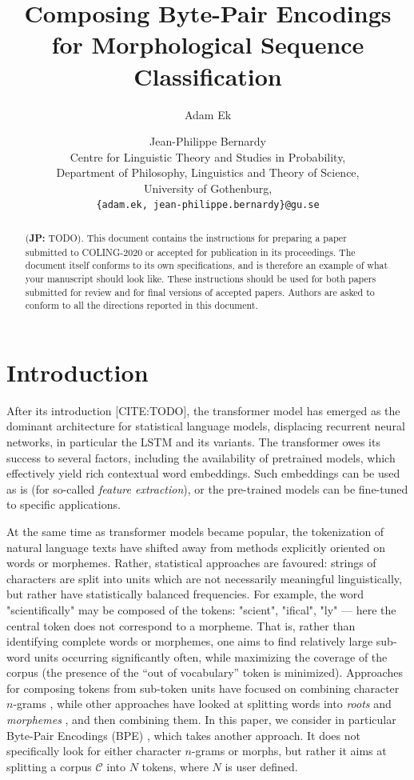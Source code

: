 \documentclass[11pt]{article}
\title{Composing Byte-Pair Encodings for Morphological Sequence Classification}
\author{Adam Ek \and Jean-Philippe Bernardy\\
	Centre for Linguistic Theory and Studies in Probability,\\
	Department of Philosophy, Linguistics and Theory of Science,\\
	University of Gothenburg,\\
	\texttt{\{adam.ek, jean-philippe.bernardy\}@gu.se}}
\date{}
\newcommand\jp[1]{(\textbf{JP:} #1)}
\newcommand\citep{\cite}
\begin{document}
	\maketitle
	
	\begin{abstract}
		\jp{TODO}. This document contains the instructions for preparing a paper submitted
		to COLING-2020 or accepted for publication in its proceedings. The document itself
		conforms to its own specifications, and is therefore an example of
		what your manuscript should look like. These instructions should be
		used for both papers submitted for review and for final versions of
		accepted papers. Authors are asked to conform to all the directions
		reported in this document.
	\end{abstract}
	
	\section{Introduction}
	\label{intro}

            After its introduction [CITE:TODO], the transformer model
     \citep{vaswani2017attention} has emerged as the dominant
     architecture for statistical language models, displacing
     recurrent neural networks, in particular the LSTM and its
     variants. The transformer owes its success to several factors,
     including the availability of pretrained models, which
     effectively yield rich contextual word embeddings. Such
     embeddings can be used as is (for so-called \emph{feature extraction}),
     or the pre-trained models can be fine-tuned to specific
     applications.

    	At the same time as transformer models became popular, the
     tokenization of natural language texts have shifted away from
     methods explicitly oriented on words or morphemes. Rather,
     statistical approaches are favoured: strings of
     characters are split into units which are not necessarily meaningful
     linguistically, but rather have statistically balanced
     frequencies. For example, the word "scientifically" may be
     composed of the tokens: "scient", "ifical", "ly" --- here the
     central token does not correspond to a morpheme.
         That is, rather than identifying complete words or morphemes,
     one aims to find relatively large sub-word units occurring
     significantly often, while maximizing the coverage of the corpus
     (the presence of the ``out of vocabulary'' token is
     minimized). Approaches for composing tokens from sub-token
     units have focused on combining character $n$-grams
     \citep{bojanowski2017enriching}, while other approaches have
     looked at splitting words into \textit{roots} and
     \textit{morphemes}
     \citep{el2012orthographic,chaudhary2018adapting,xu2017implicitly},
     and then combining them. In this paper, we consider in particular
     Byte-Pair Encodings (BPE) \citep{sennrich2015neural}, which takes
     another approach. It does not specifically look for either
     character $n$-grams or morphs, but rather it aims at splitting a
     corpus $\mathcal{C}$ into $N$ tokens, where $N$ is user
     defined.
\end{document}
